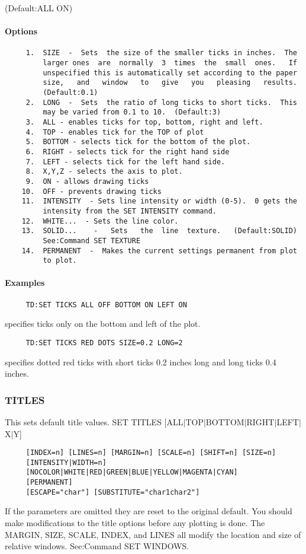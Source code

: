(Default:ALL ON) 
\paragraph{Options}

\begin{verbatim}
     1.  SIZE  -  Sets  the size of the smaller ticks in inches.  The
         larger ones  are  normally  3  times  the  small  ones.   If
         unspecified this is automatically set according to the paper
         size,   and   window   to   give   you   pleasing   results.
         (Default:0.1) 
     2.  LONG  -  Sets  the ratio of long ticks to short ticks.  This
         may be varied from 0.1 to 10.  (Default:3) 
     3.  ALL - enables ticks for top, bottom, right and left.  
     4.  TOP - enables tick for the TOP of plot 
     5.  BOTTOM - selects tick for the bottom of the plot.  
     6.  RIGHT - selects tick for the right hand side 
     7.  LEFT - selects tick for the left hand side.  
     8.  X,Y,Z - selects the axis to plot.  
     9.  ON - allows drawing ticks 
    10.  OFF - prevents drawing ticks 
    11.  INTENSITY  - Sets line intensity or width (0-5).  0 gets the
         intensity from the SET INTENSITY command.  
    12.  WHITE...  - Sets the line color.  
    13.  SOLID...    -   Sets   the  line  texture.   (Default:SOLID)
         See:Command SET TEXTURE 
    14.  PERMANENT  -  Makes the current settings permanent from plot
         to plot.  
\end{verbatim}

\paragraph{Examples}
\begin{verbatim}
     TD:SET TICKS ALL OFF BOTTOM ON LEFT ON 
\end{verbatim}
specifies ticks only on the bottom and left of the plot.  
\begin{verbatim}
     TD:SET TICKS RED DOTS SIZE=0.2 LONG=2 
\end{verbatim}
specifies  dotted red ticks with short ticks 0.2 inches long and long
ticks 0.4 inches.  
\subsubsection{TITLES}
This sets default title values.  
SET TITLES [ALL$|$TOP$|$BOTTOM$|$RIGHT$|$LEFT$|$X$|$Y] 
\begin{verbatim}
     [INDEX=n] [LINES=n] [MARGIN=n] [SCALE=n] [SHIFT=n] [SIZE=n] 
     [INTENSITY|WIDTH=n] 
     [NOCOLOR|WHITE|RED|GREEN|BLUE|YELLOW|MAGENTA|CYAN] 
     [PERMANENT] 
     [ESCAPE="char"] [SUBSTITUTE="char1char2"] 
\end{verbatim}
If  the  parameters are omitted they are reset to the original default.
You should make modifications to the title options before any  plotting
is  done.   The  MARGIN,  SIZE,  SCALE, INDEX, and LINES all modify the
location and size of relative windows.  See:Command SET WINDOWS.  
